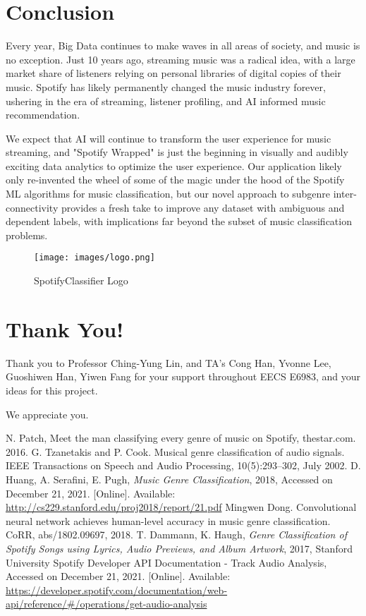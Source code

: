 \documentclass[conference]{IEEEtran}
\begin{document}
\pagebreak
\section{Conclusion}
Every year, Big Data continues to make waves in all areas of society, and music is no exception. Just 10 years ago, streaming music was a radical idea, with a large market share of listeners relying on personal libraries of digital copies of their music. Spotify has likely permanently changed the music industry forever, ushering in the era of streaming, listener profiling, and AI informed music recommendation. 

We expect that AI will continue to transform the user experience for music streaming, and "Spotify Wrapped" is just the beginning in visually and audibly exciting data analytics to optimize the user experience. Our application likely only re-invented the wheel of some of the magic under the hood of the Spotify ML algorithms for music classification, but our novel approach to subgenre inter-connectivity provides a fresh take to improve any dataset with ambiguous and dependent labels, with implications far beyond the subset of music classification problems.

\begin{figure}[htbp]
\centerline{\texttt{[image: images/logo.png]}}
\caption{SpotifyClassifier Logo}
\label{fig:logo}
\end{figure}


\pagebreak
\section*{Thank You!}
Thank you to Professor Ching-Yung Lin, and TA's Cong Han, Yvonne Lee, Guoshiwen Han, Yiwen Fang for your support throughout EECS E6983, and your ideas for this project.

We appreciate you.


\pagebreak
\begin{thebibliography}{00}
 N. Patch, Meet the man classifying every genre of music on Spotify, thestar.com. 2016.
 G. Tzanetakis and P. Cook. Musical genre classification of audio signals. IEEE Transactions on Speech and Audio Processing, 10(5):293–302, July 2002.
 D. Huang, A. Serafini, E. Pugh, \emph{Music Genre Classification}, 2018, Accessed on December 21, 2021. [Online]. Available: \url{http://cs229.stanford.edu/proj2018/report/21.pdf}
 Mingwen Dong. Convolutional neural network achieves human-level accuracy in music genre classification. CoRR, abs/1802.09697, 2018.
 T. Dammann, K. Haugh, \emph{Genre Classification of Spotify Songs using Lyrics, Audio Previews, and Album Artwork}, 2017, Stanford University
 Spotify Developer API Documentation - Track Audio Analysis, Accessed on December 21, 2021. [Online]. Available: \url{ https://developer.spotify.com/documentation/web-api/reference/#/operations/get-audio-analysis}

\end{thebibliography}
\end{document}
